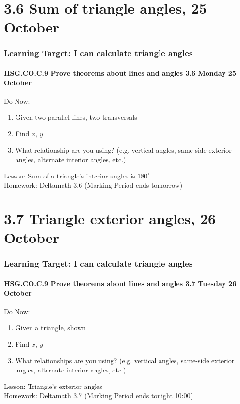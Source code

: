 \documentclass{beamer}
\begin{document}
\section{3.6 Sum of triangle angles, 25 October}
\frame
{
  \frametitle{Learning Target: I can calculate triangle angles}
  \framesubtitle{HSG.CO.C.9 Prove theorems about lines and angles  \hfill \alert{3.6 Monday 25 October}}
  Do Now: 
  \begin{multicols}{2}
    \begin{enumerate}
      \item Given two parallel lines, two transversals
      \item Find $x$, $y$
      \item What relationship are you using? (e.g. vertical angles, same-side exterior angles, alternate interior angles, etc.)
    \end{enumerate}
  \end{multicols}
  Lesson: Sum of a triangle's interior angles is $180^\circ$ \\[0.25cm]
  Homework: Deltamath 3.6 (Marking Period ends tomorrow)
}

\section{3.7 Triangle exterior angles, 26 October}
\frame
{
  \frametitle{Learning Target: I can calculate triangle angles}
  \framesubtitle{HSG.CO.C.9 Prove theorems about lines and angles  \hfill \alert{3.7 Tuesday 26 October}}
  Do Now: 
  \begin{multicols}{2}
    \begin{enumerate}
      \item Given a triangle, shown
      \item Find $x$, $y$
      \item What relationships are you using? (e.g. vertical angles, same-side exterior angles, alternate interior angles, etc.)
    \end{enumerate}
  \end{multicols}
  Lesson: Triangle's exterior angles\\[0.25cm]
  Homework: Deltamath 3.7 (Marking Period ends tonight 10:00)
}
\end{document}
